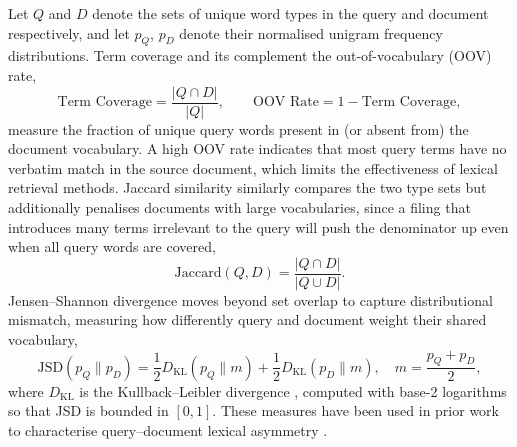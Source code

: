 \documentclass[12pt,twoside,maitrise]{dms}
\theoremstyle{definition}
\numberwithin{equation}{section}
\numberwithin{table}{chapter}
\numberwithin{figure}{chapter}
\begin{document}
Let $Q$ and $D$ denote the sets of unique word types in the query and document
respectively, and let $p_Q$, $p_D$ denote their normalised unigram frequency
distributions. Term coverage and its complement the out-of-vocabulary (OOV) rate,
\begin{equation}
  \text{Term Coverage} = \frac{|Q \cap D|}{|Q|}, \qquad
  \text{OOV Rate} = 1 - \text{Term Coverage},
\end{equation}
measure the fraction of unique query words present in (or absent from) the document
vocabulary. A high OOV rate indicates that most query terms have no verbatim match in
the source document, which limits the effectiveness of lexical retrieval methods. Jaccard similarity \citep{jaccard1901etude, manning2008introduction}
similarly compares the two type sets but additionally penalises documents with large
vocabularies, since a filing that introduces many terms irrelevant to the query will
push the denominator up even when all query words are covered,
\begin{equation}
  \text{Jaccard}(Q, D) = \frac{|Q \cap D|}{|Q \cup D|}.
\end{equation}
Jensen--Shannon divergence \citep{lin1991divergence} moves beyond set overlap to
capture distributional mismatch, measuring how differently query and document weight
their shared vocabulary,
\begin{equation}
  \text{JSD}(p_Q \| p_D) = \frac{1}{2} D_{\mathrm{KL}}(p_Q \| m)
                          + \frac{1}{2} D_{\mathrm{KL}}(p_D \| m), \quad
  m = \frac{p_Q + p_D}{2},
\end{equation}
where $D_{\mathrm{KL}}$ is the Kullback--Leibler divergence
\citep{kullback1951information}, computed with base-2 logarithms so that JSD is
bounded in $[0,1]$. These measures have been used in prior work to characterise
query--document lexical asymmetry \citep{Kohail2017MatchingRA, luetal2020diverging}.
\end{document}
